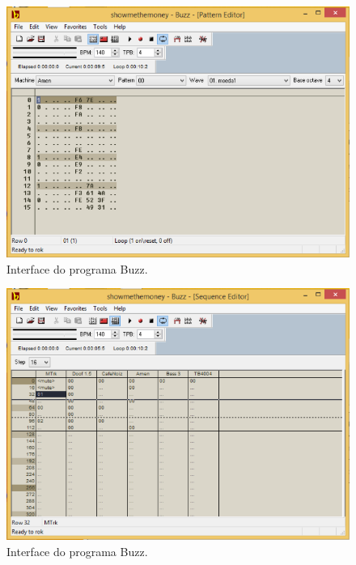 \begin{figure}
\centering
\includegraphics[width=1\textwidth]{pictures/cap1/buzz}
\caption{Interface do programa Buzz.}
\label{fig:buzz}
\end{figure}

\begin{figure}
\centering
\includegraphics[width=1\textwidth]{pictures/cap1/buzz3}
\caption{Interface do programa Buzz.}
\label{fig:buzz3}
\end{figure}

